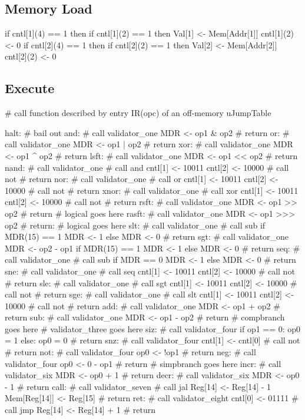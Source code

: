 \documentclass[12pt]{article}
\begin{document}
\subsection{Memory Load}
\begin{verbatimtab}
if cntl[1](4) == 1 then
    if cntl[1](2) == 1 then
        Val[1] <- Mem[Addr[1]]
        cntl[1](2) <- 0
if cntl[2](4) == 1 then
    if cntl[2](2) == 1 then
        Val[2] <- Mem[Addr[2]]
        cntl[2](2) <- 0
\end{verbatimtab}

\subsection{Execute}
\begin{verbatimtab}
# call function described by entry IR(opc) of an off-memory uJumpTable

halt:
# bail out
and:
    # call validator_one
    MDR <- op1 & op2
    # return
or:
    # call validator_one
    MDR <- op1 | op2
    # return
xor:
    # call validator_one
    MDR <- op1 ^ op2
    # return
lsft:
    # call validator_one
    MDR <- op1 << op2
    # return
nand:
    # call validator_one
    # call and
    cntl[1] <- 10011
    cntl[2] <- 10000
    # call not
    # return
nor:
    # call validator_one
    # call or
    cntl[1] <- 10011
    cntl[2] <- 10000
    # call not
    # return
xnor:
    # call validator_one
    # call xor
    cntl[1] <- 10011
    cntl[2] <- 10000
    # call not
    # return
rsft:
    # call validator_one
    MDR <- op1 >> op2
    # return
# logical goes here
rasft:
    # call validator_one
    MDR <- op1 >>> op2
    # return:
# logical goes here
slt:
    # call validator_one
    # call sub
    if MDR(15) == 1
        MDR <- 1
    else
        MDR <- 0
    # return
sgt:
    # call validator_one
    MDR <- op2 - op1
    if MDR(15) == 1
        MDR <- 1
    else
        MDR <- 0
    # return
seq:
    # call validator_one
    # call sub
    if MDR == 0
        MDR <- 1
    else
        MDR <- 0
    # return
sne:
    # call validator_one
    # call seq
    cntl[1] <- 10011
    cntl[2] <- 10000
    # call not
    # return
sle:
    # call validator_one
    # call sgt
    cntl[1] <- 10011
    cntl[2] <- 10000
    # call not
    # return
sge:
    # call validator_one
    # call slt
    cntl[1] <- 10011
    cntl[2] <- 10000
    # call not
    # return    
add:
    # call validator_one
    MDR <- op1 + op2
    # return
sub:
    # call validator_one
    MDR <- op1 - op2
    # return
# compbranch goes here
# validator_three goes here
siz:
    # call validator_four
    if op1 == 0:
       op0 = 1
    else:
       op0 = 0
    # return
snz:
    # call validator_four
    cntl[1] <- cntl[0]    
    # call not
    # return
not:
    # call validator_four
    op0 <- !op1
    # return
neg:
    # call validator_four
    op0 <- 0 - op1
    # return
# simpbranch goes here
incr:
	# call validator_six
	MDR <- op0 + 1
	# return
decr:
	# call validator_six
	MDR <- op0 - 1
	# return
call:
	# call validator_seven
	# call jal
	Reg[14] <- Reg[14] - 1
	Mem[Reg[14]] <- Reg[15]
	# return
ret:
	# call validator_eight
	cntl[0] <- 01111
	# call jmp
	Reg[14] <- Reg[14] + 1
	# return


\end{verbatimtab}
\end{document}
